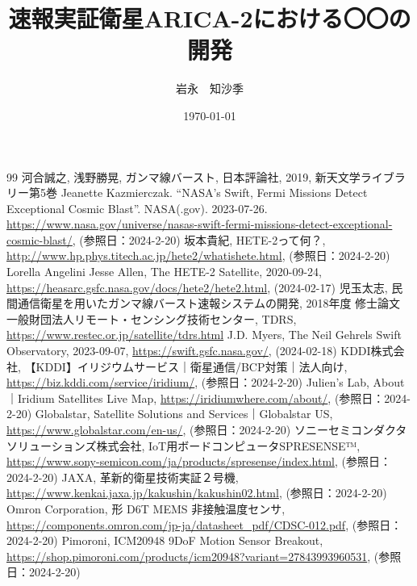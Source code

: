 \documentclass[a4paper]{ltjsreport}
\title{速報実証衛星ARICA-2における〇〇の開発}
\author{岩永　知沙季}
\date{\today}
\begin{document}
\maketitle

\tableofcontents %









\appendix



\begin{thebibliography}{99}
 河合誠之, 浅野勝晃, ガンマ線バースト, 日本評論社, 2019, 新天文学ライブラリー第5巻
 Jeanette Kazmierczak. “NASA’s Swift, Fermi Missions Detect Exceptional Cosmic Blast”. NASA(.gov). 2023-07-26. \url{https://www.nasa.gov/universe/nasas-swift-fermi-missions-detect-exceptional-cosmic-blast/}, (参照日：2024-2-20)
 坂本貴紀, HETE-2って何？, \url{http://www.hp.phys.titech.ac.jp/hete2/whatishete.html}, (参照日：2024-2-20)
 Lorella Angelini Jesse Allen, The HETE-2 Satellite, 2020-09-24, \url{https://heasarc.gsfc.nasa.gov/docs/hete2/hete2.html}, (2024-02-17)
 児玉太志, 民間通信衛星を用いたガンマ線バースト速報システムの開発, 2018年度 修士論文
 一般財団法人リモート・センシング技術センター, TDRS, \url{https://www.restec.or.jp/satellite/tdrs.html}
 J.D. Myers, The Neil Gehrels Swift Observatory, 2023-09-07, \url{https://swift.gsfc.nasa.gov/}, (2024-02-18)
 KDDI株式会社, 【KDDI】イリジウムサービス｜衛星通信/BCP対策｜法人向け, \url{https://biz.kddi.com/service/iridium/}, (参照日：2024-2-20)
 Julien's Lab, About｜Iridium Satellites Live Map, \url{https://iridiumwhere.com/about/}, (参照日：2024-2-20)
 Globalstar, Satellite Solutions and Services｜Globalstar US, \url{https://www.globalstar.com/en-us/}, (参照日：2024-2-20)
 ソニーセミコンダクタソリューションズ株式会社, IoT用ボードコンピュータSPRESENSE™, \url{https://www.sony-semicon.com/ja/products/spresense/index.html}, (参照日：2024-2-20)
 JAXA, 革新的衛星技術実証２号機, \url{https://www.kenkai.jaxa.jp/kakushin/kakushin02.html}, (参照日：2024-2-20)
 Omron Corporation, 形 D6T MEMS 非接触温度センサ, \url{https://components.omron.com/jp-ja/datasheet_pdf/CDSC-012.pdf}, (参照日：2024-2-20)
 Pimoroni, ICM20948 9DoF Motion Sensor Breakout, \url{https://shop.pimoroni.com/products/icm20948?variant=27843993960531}, (参照日：2024-2-20)

\end{thebibliography}
\end{document}
